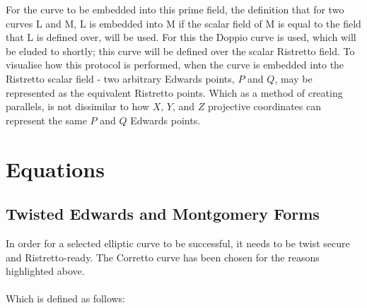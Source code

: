 \documentclass{article}
\begin{document}
For the curve to be embedded into this prime field, the definition that for two curves L and M, L is embedded into M if the scalar field of M is equal to the field that L is defined over, will be used. For this the Doppio curve is used, which will be eluded to shortly; this curve will be defined over the scalar Ristretto field. To visualise how this protocol is performed, when the curve is embedded into the Ristretto scalar field - two arbitrary Edwards points, $P$ and $Q$, may be represented as the equivalent Ristretto points. Which as a method of creating parallels, is not dissimilar to how $X$, $Y$, and $Z$ projective coordinates can represent the same $P$ and $Q$ Edwards points.
\section{Equations}
\subsection{Twisted Edwards and Montgomery Forms}
In order for a selected elliptic curve to be successful, it needs to be twist secure and Ristretto-ready. The Corretto curve has been chosen for the reasons highlighted above. \\\\
Which is defined as follows: \\\\
\noindent{}
\end{document}
